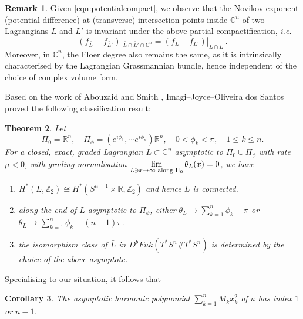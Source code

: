 \documentclass[11pt,a4paper]{article}
\numberwithin{equation}{section}%
\newtheorem{thm}{Theorem}[section]
\newtheorem{cor}[thm]{Corollary}
\theoremstyle{definition}
\newtheorem{rmk}[thm]{Remark}
\newcommand{\ie}{\emph{i.e.} }
\newcommand{\R}{\mathbb{R}}
\newcommand{\C}{\mathbb{C}}
\newcommand{\Z}{\mathbb{Z}}
\begin{document}
\begin{rmk}\label{rmk:potentialinv}
Given \eqref{eqn:potentialcompact}, we observe that the Novikov exponent (potential difference) at (transverse) intersection points inside $\C^n$ of two Lagrangians $ L$ and $L'$
is invariant under the above partial compactification, \ie 
$$(f_{\bar L}-f_{\bar L'})|_{\bar L\cap \bar L'\cap \C^n}=(f_L-f_{L'})|_{L\cap L'}.$$
Moreover, in $\C^n$, the Floer degree also remains the same, as it is intrinsically characterised by the Lagrangian Grassmannian bundle, hence independent of the choice of complex volume form. 
\end{rmk}

Based on the work of Abouzaid and Smith \cite{Abouzaid-Smith}, Imagi--Joyce--Oliveira dos Santos proved the following classification result: 
\begin{thm}{\textup{\cite[Theorem 2.17, Corollary 2.18]{IJS}}} \label{thm:classifyaclag} 
Let 
$$\Pi_0=\R^n,\quad \Pi_\phi=(e^{i\phi_1},\cdots e^{i\phi_n})\R^n,\quad 0<\phi_k<\pi,\quad 1\leqslant k\leqslant n.$$
For a closed, exact, graded Lagrangian $L\subset \C^n$ asymptotic to $\Pi_0\cup \Pi_\phi$ with rate $\mu<0$, with grading normalisation $\lim\limits_{L\ni x\to \infty \textnormal{~along }\Pi_0}\theta_L(x)=0$, we have 
\begin{enumerate}
    \item [\textnormal{(1)}] $H^*(L,\Z_2)\cong H^*(S^{n-1}\times \R,\Z_2)$ and hence $L$ is connected. 
    \item [\textnormal{(2)}] along the end of $L$ asymptotic to $\Pi_\phi$, either $\theta_{L}\to\sum\limits_{k=1}^n\phi_k-\pi$ or $\theta_{L}\to \sum\limits_{k=1}^n\phi_k-(n-1)\pi$. 
    \item [\textnormal{(3)}] the isomorphism class of $\bar L$ in $D^bFuk(T^*S^n\#T^*S^n)$ is determined by the choice of the above asymptote.
\end{enumerate}
\end{thm}
Specialising to our situation, it follows that
\begin{cor}\label{cor:indexv}
    The asymptotic harmonic polynomial $\sum \limits_{k=1}^nM_kx_k^2$ of $u$ has index $1$ or $n-1$. 
\end{cor}
\end{document}
